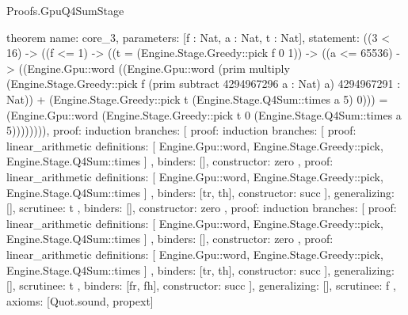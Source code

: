 \begin{lexlean}{Proofs.GpuQ4SumStage}
\begin{semanticmodule}
theorem{
  name: core_3,
  parameters: [f : Nat, a : Nat, t : Nat],
  statement: ((3 < 16) -> ((f <= 1) -> ((t = (Engine.Stage.Greedy::pick f 0 1)) -> ((a <= 65536) -> ((Engine.Gpu::word ((Engine.Gpu::word (prim multiply (Engine.Stage.Greedy::pick f (prim subtract 4294967296 a : Nat) a) 4294967291 : Nat)) + (Engine.Stage.Greedy::pick t (Engine.Stage.Q4Sum::times a 5) 0))) = (Engine.Gpu::word (Engine.Stage.Greedy::pick t 0 (Engine.Stage.Q4Sum::times a 5)))))))),
  proof: induction{
    branches: [
      {
        proof: induction{
          branches: [
            {
              proof: linear_arithmetic{
                definitions: [
                  Engine.Gpu::word,
                  Engine.Stage.Greedy::pick,
                  Engine.Stage.Q4Sum::times
                ]
              },
              binders: [],
              constructor: zero
            },
            {
              proof: linear_arithmetic{
                definitions: [
                  Engine.Gpu::word,
                  Engine.Stage.Greedy::pick,
                  Engine.Stage.Q4Sum::times
                ]
              },
              binders: [tr, th],
              constructor: succ
            }
          ],
          generalizing: [],
          scrutinee: t
        },
        binders: [],
        constructor: zero
      },
      {
        proof: induction{
          branches: [
            {
              proof: linear_arithmetic{
                definitions: [
                  Engine.Gpu::word,
                  Engine.Stage.Greedy::pick,
                  Engine.Stage.Q4Sum::times
                ]
              },
              binders: [],
              constructor: zero
            },
            {
              proof: linear_arithmetic{
                definitions: [
                  Engine.Gpu::word,
                  Engine.Stage.Greedy::pick,
                  Engine.Stage.Q4Sum::times
                ]
              },
              binders: [tr, th],
              constructor: succ
            }
          ],
          generalizing: [],
          scrutinee: t
        },
        binders: [fr, fh],
        constructor: succ
      }
    ],
    generalizing: [],
    scrutinee: f
  },
  axioms: [Quot.sound, propext]
}


\end{semanticmodule}
\end{lexlean}
